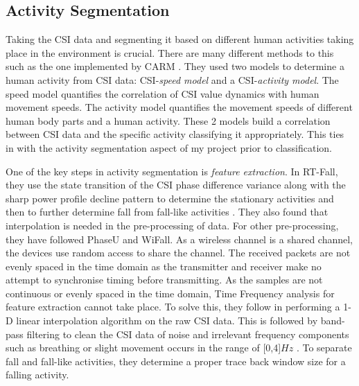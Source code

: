 \subsection{Activity Segmentation}
Taking the CSI data and segmenting it based on different human activities taking place in the environment is crucial. There are many different methods to this such as the one implemented by CARM \citep{CARM}. They used two models to determine a human activity from CSI data: CSI-\textit{speed model} and a CSI-\textit{activity model}. The speed model quantifies the correlation of CSI value dynamics with human movement speeds. The activity model quantifies the movement speeds of different human body parts and a human activity. These 2 models build a correlation between CSI data and the specific activity classifying it appropriately. This ties in with the activity segmentation aspect of my project prior to classification. \par
One of the key steps in activity segmentation is \textit{feature extraction}. In RT-Fall, they use the state transition of the CSI phase difference variance along with the sharp power profile decline pattern to determine the stationary activities and then to further determine fall from fall-like activities \citep{RTFall}. They also found that interpolation is needed in the pre-processing of data. For other pre-processing, they have followed PhaseU and WiFall. As a wireless channel is a shared channel, the devices use random access to share the channel. The received packets are not evenly spaced in the time domain as the transmitter and receiver make no attempt to synchronise timing before transmitting. As the samples are not continuous or evenly spaced in the time domain, Time Frequency analysis for feature extraction cannot take place. To solve this, they follow \cite{gestureCSI} in performing a 1-D linear interpolation algorithm on the raw CSI data. This is followed by band-pass filtering to clean the CSI data of noise and irrelevant frequency components such as breathing or slight movement occurs in the range of [0,4]$Hz$ \citep{RTFall}. To separate fall and fall-like activities, they determine a proper trace back window size for a falling activity. 

